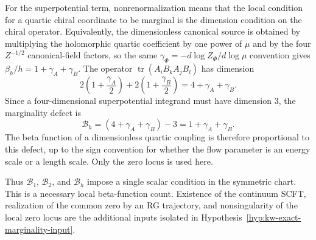 For the superpotential term, nonrenormalization means that the local
condition for a quartic chiral coordinate to be marginal is the dimension
condition on the chiral operator.  Equivalently, the dimensionless canonical
source is obtained by multiplying the holomorphic quartic coefficient by one
power of \(\mu\) and by the four \(Z^{-1/2}\) canonical-field factors, so the
same \(\gamma_\Phi=-d\log Z_\Phi/d\log\mu\) convention gives
\(\beta_h/h=1+\gamma_A+\gamma_B\).  The operator
\(\operatorname{tr}(A_iB_kA_jB_l)\) has dimension
\[
  2\left(1+\frac{\gamma_A}{2}\right)
  +
  2\left(1+\frac{\gamma_B}{2}\right)
  =
  4+\gamma_A+\gamma_B .
\]
Since a four-dimensional superpotential integrand must have dimension \(3\),
the marginality defect is
\[
  \mathcal B_h
  =
  (4+\gamma_A+\gamma_B)-3
  =
  1+\gamma_A+\gamma_B .
\]
The beta function of a dimensionless quartic coupling is therefore
proportional to this defect, up to the sign convention for whether the flow
parameter is an energy scale or a length scale.  Only the zero locus is used
here.

Thus \(\mathcal B_1\), \(\mathcal B_2\), and \(\mathcal B_h\) impose a single
scalar condition in the symmetric chart.  This is a necessary local
beta-function count.  Existence of the continuum SCFT, realization of the
common zero by an RG trajectory, and nonsingularity of the local zero locus are
the additional inputs isolated in
Hypothesis~\ref{hyp:kw-exact-marginality-input}.

